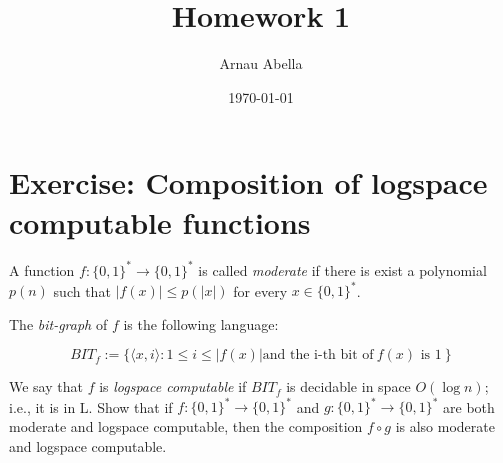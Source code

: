 \documentclass[12pt, a4paper]{article}
\title{Homework 1}
\author{Arnau Abella}
\date{\today}
\begin{document}
\section{Exercise: Composition of logspace computable functions}

A function $f : \{ 0,1 \} ^* \to \{ 0,1 \} ^*$ is called \textit{moderate} if there is exist a polynomial $p(n)$ such that $|f(x)| \leq p(|x|)$ for every $x \in \{ 0, 1 \} ^*$.


The \textit{bit-graph} of $f$ is the following language:


\[
BIT_f := \{  \langle x, i \rangle : 1 \leq i \leq |f(x)| \text{and the i-th bit of}\ f(x) \text{ is 1}\ \}
\]


We say that $f$ is \textit{logspace computable} if $BIT_f$ is decidable in space $O(\log n)$; i.e., it is in L. Show that if $f : \{ 0,1 \} ^* \to \{ 0,1 \} ^*$ and $g : \{ 0,1 \} ^* \to \{ 0,1 \} ^*$ are both moderate and logspace computable, then the composition $f \circ g$ is also moderate and logspace computable.
\end{document}
